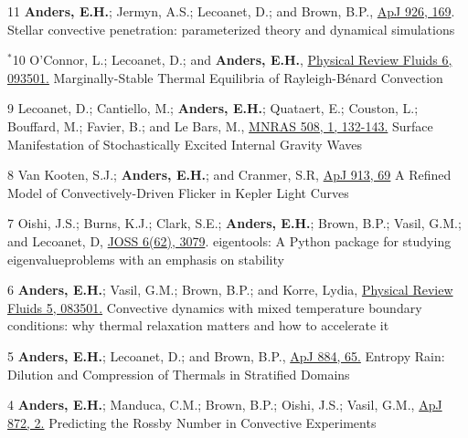 \cvpub{}
	  {11}
	  {
		\textbf{Anders, E.H.}; Jermyn, A.S.; Lecoanet, D.; and Brown, B.P., 
        \href{https://iopscience.iop.org/article/10.3847/1538-4357/ac408d}{ApJ 926, 169}.
	  }
	  {Stellar convective penetration: parameterized theory and dynamical simulations}

	  {$^*$10}
	  {
		O'Connor, L.; Lecoanet, D.; and \textbf{Anders, E.H.}, 
		  \href{https://journals.aps.org/prfluids/abstract/10.1103/PhysRevFluids.6.093501}{Physical Review Fluids 6, 093501.}
	  }
	  {Marginally-Stable Thermal Equilibria of Rayleigh-B\'{e}nard Convection}

\cvpub{}
	  {9}
	  {
		Lecoanet, D.; Cantiello, M.; \textbf{Anders, E.H.}; Quataert, E.; Couston, L.; Bouffard, M.; Favier, B.; and Le Bars, M.,
          \href{https://doi.org/10.1093/mnras/stab2524}{MNRAS 508, 1, 132-143.}
	  }
	  {Surface Manifestation of Stochastically Excited Internal Gravity Waves}

\cvpub{}
	  {8}
	  {
		 Van Kooten, S.J.; \textbf{Anders, E.H.}; and Cranmer, S.R,
		  \href{https://iopscience.iop.org/article/10.3847/1538-4357/abf7bf}{ApJ 913, 69}
	  }
	  {A Refined Model of Convectively-Driven Flicker in Kepler Light Curves}

\cvpub{}
	  {7}
	  {
		Oishi, J.S.; Burns, K.J.; Clark, S.E.; \textbf{Anders, E.H.}; Brown, B.P.; Vasil, G.M.; and Lecoanet, D,
		  \href{https://joss.theoj.org/papers/10.21105/joss.03079}{JOSS 6(62), 3079}.
	  }
	  {eigentools: A Python package for studying eigenvalueproblems with an emphasis on stability}

	  {6}
	  {
		  \textbf{Anders, E.H.}; Vasil, G.M.; Brown, B.P.; and Korre, Lydia, 
		  \href{https://journals.aps.org/prfluids/abstract/10.1103/PhysRevFluids.5.083501}{Physical Review Fluids 5, 083501.}
	  }
	  {Convective dynamics with mixed temperature boundary conditions: why thermal relaxation matters and how to accelerate it}

	  {5}
	  {
		  \textbf{Anders, E.H.}; Lecoanet, D.; and Brown, B.P., 
		  \href{https://iopscience.iop.org/article/10.3847/1538-4357/ab3644}{ApJ 884, 65.}
	  }
	  {Entropy Rain: Dilution and Compression of Thermals in Stratified Domains}

\cvpub{}
	  {4}
	  {
		  \textbf{Anders, E.H.}; Manduca, C.M.; Brown, B.P.; Oishi, J.S.; Vasil, G.M., 
		  \href{https://iopscience.iop.org/article/10.3847/1538-4357/aaff61}{ApJ 872, 2.}
	  }
	  {Predicting the Rossby Number in Convective Experiments}

